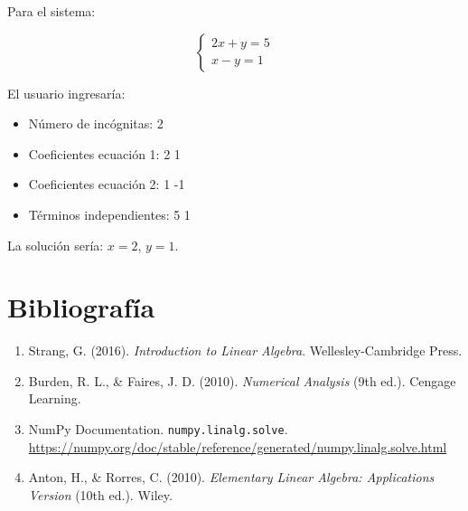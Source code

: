 \documentclass[12pt]{article}
\begin{document}
	Para el sistema:
	
	\[
	\begin{cases}
		2x + y = 5 \\
		x - y = 1
	\end{cases}
	\]
	
	El usuario ingresaría:
	
	\begin{itemize}
		\item Número de incógnitas: 2
		\item Coeficientes ecuación 1: 2 1
		\item Coeficientes ecuación 2: 1 -1
		\item Términos independientes: 5 1
	\end{itemize}
	
	La solución sería: $x = 2$, $y = 1$.
	
	\section{Bibliografía}
	
	\begin{enumerate}
		\item Strang, G. (2016). \textit{Introduction to Linear Algebra}. Wellesley-Cambridge Press.
		\item Burden, R. L., \& Faires, J. D. (2010). \textit{Numerical Analysis} (9th ed.). Cengage Learning.
		\item NumPy Documentation. \texttt{numpy.linalg.solve}. \url{https://numpy.org/doc/stable/reference/generated/numpy.linalg.solve.html}
		\item Anton, H., \& Rorres, C. (2010). \textit{Elementary Linear Algebra: Applications Version} (10th ed.). Wiley.
	\end{enumerate}
	
\end{document}
